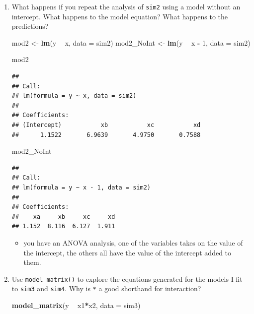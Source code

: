 \documentclass[]{book}
\newenvironment{Shaded}{\begin{snugshade}}{\end{snugshade}}
\newcommand{\DataTypeTok}[1]{\textcolor[rgb]{0.13,0.29,0.53}{#1}}
\newcommand{\DecValTok}[1]{\textcolor[rgb]{0.00,0.00,0.81}{#1}}
\newcommand{\KeywordTok}[1]{\textcolor[rgb]{0.13,0.29,0.53}{\textbf{#1}}}
\newcommand{\NormalTok}[1]{#1}
\newcommand{\OperatorTok}[1]{\textcolor[rgb]{0.81,0.36,0.00}{\textbf{#1}}}
\newcommand{\StringTok}[1]{\textcolor[rgb]{0.31,0.60,0.02}{#1}}
\providecommand{\tightlist}{%
  \setlength{\itemsep}{0pt}\setlength{\parskip}{0pt}}
\theoremstyle{definition}
\theoremstyle{definition}
\theoremstyle{definition}
\theoremstyle{remark}
\begin{document}
\begin{enumerate}
\def\labelenumi{\arabic{enumi}.}
\item
  What happens if you repeat the analysis of \texttt{sim2} using a model
  without an intercept. What happens to the model equation? What happens
  to the predictions?

\begin{Shaded}
\begin{Highlighting}[]
\NormalTok{mod2 <-}\StringTok{ }\KeywordTok{lm}\NormalTok{(y }\OperatorTok{~}\StringTok{ }\NormalTok{x, }\DataTypeTok{data =}\NormalTok{ sim2)}
\NormalTok{mod2_NoInt <-}\StringTok{ }\KeywordTok{lm}\NormalTok{(y }\OperatorTok{~}\StringTok{ }\NormalTok{x }\OperatorTok{-}\StringTok{ }\DecValTok{1}\NormalTok{, }\DataTypeTok{data =}\NormalTok{ sim2)}

\NormalTok{mod2}
\end{Highlighting}
\end{Shaded}

\begin{verbatim}
## 
## Call:
## lm(formula = y ~ x, data = sim2)
## 
## Coefficients:
## (Intercept)           xb           xc           xd  
##      1.1522       6.9639       4.9750       0.7588
\end{verbatim}

\begin{Shaded}
\begin{Highlighting}[]
\NormalTok{mod2_NoInt}
\end{Highlighting}
\end{Shaded}

\begin{verbatim}
## 
## Call:
## lm(formula = y ~ x - 1, data = sim2)
## 
## Coefficients:
##    xa     xb     xc     xd  
## 1.152  8.116  6.127  1.911
\end{verbatim}

  \begin{itemize}
  \tightlist
  \item
    you have an ANOVA analysis, one of the variables takes on the value
    of the intercept, the others all have the value of the intercept
    added to them.
  \end{itemize}
\item
  Use \texttt{model\_matrix()} to explore the equations generated for
  the models I fit to \texttt{sim3} and \texttt{sim4}. Why is \texttt{*}
  a good shorthand for interaction?

\begin{Shaded}
\begin{Highlighting}[]
\KeywordTok{model_matrix}\NormalTok{(y }\OperatorTok{~}\StringTok{ }\NormalTok{x1}\OperatorTok{*}\NormalTok{x2, }\DataTypeTok{data =}\NormalTok{ sim3)}
\end{Highlighting}
\end{Shaded}


\end{enumerate}
\end{document}
